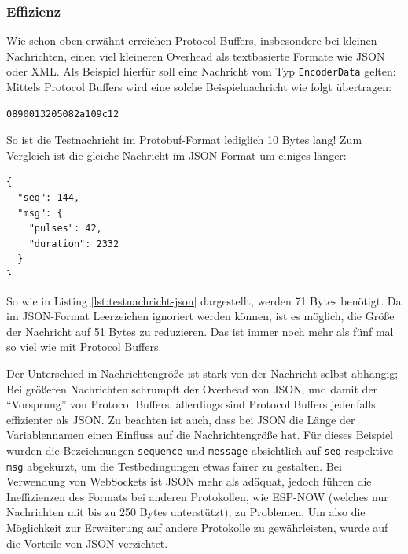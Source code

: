 \subsubsection{Effizienz}
Wie schon oben erwähnt erreichen Protocol Buffers,
insbesondere bei kleinen Nachrichten,
einen viel kleineren Overhead als textbasierte Formate wie JSON oder XML.
%
Als Beispiel hierfür soll eine Nachricht vom Typ \texttt{EncoderData} gelten:
%
Mittels Protocol Buffers wird eine solche Beispielnachricht wie folgt übertragen:
%
\begin{lstlisting}[label=lst:testnachricht-proto,caption=Testnachricht (Protobuf) in Hexadezimaldarstellung]
    0890013205082a109c12
\end{lstlisting}
So ist die Testnachricht im Protobuf-Format lediglich 10 Bytes lang!
%
Zum Vergleich ist die gleiche Nachricht im JSON-Format um einiges länger:
\begin{lstlisting}[label=lst:testnachricht-json,caption=Testnachricht (JSON) als formattierter String]
{
  "seq": 144,
  "msg": {
    "pulses": 42,
    "duration": 2332
  }
}
\end{lstlisting}
So wie in Listing \ref{lst:testnachricht-json} dargestellt,
werden 71 Bytes benötigt.
Da im JSON-Format Leerzeichen ignoriert werden können,
ist es möglich, die Größe der Nachricht auf 51 Bytes zu reduzieren.
%
Das ist immer noch mehr als fünf mal so viel wie mit Protocol Buffers.

Der Unterschied in Nachrichtengröße ist stark von der Nachricht selbst abhängig;
Bei größeren Nachrichten schrumpft der Overhead von JSON,
und damit der ``Vorsprung'' von Protocol Buffers,
allerdings sind Protocol Buffers jedenfalls effizienter als JSON.
%
Zu beachten ist auch,
dass bei JSON die Länge der Variablennamen einen Einfluss auf die Nachrichtengröße hat.
%
Für dieses Beispiel wurden die Bezeichnungen \texttt{sequence} und \texttt{message} absichtlich auf
\texttt{seq} respektive \texttt{msg} abgekürzt,
um die Testbedingungen etwas fairer zu gestalten.
%
Bei Verwendung von WebSockets ist JSON mehr als adäquat,
jedoch führen die Ineffizienzen des Formats bei anderen Protokollen,
wie ESP-NOW \cite{esp-now} (welches nur Nachrichten mit bis zu 250 Bytes unterstützt),
zu Problemen.
%
Um also die Möglichkeit zur Erweiterung auf andere Protokolle zu gewährleisten,
wurde auf die Vorteile von JSON verzichtet.


